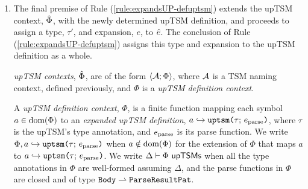{{{{\begin{enumerate}
\begin{condition} All of the following must hold:
\begin{enumerate}
\item For every $\cpv$, we have $\encodeCEPat{\cpv}{\ecand}$ for some $\ecand$ such that $\hastypeUC{\ecand}{\tCEPat}$ and $\isvalU{\ecand}$.
\item If $\hastypeUC{\ecand}{\tCEPat}$ and $\isvalU{\ecand}$ then $\decodeCEPat{\ecand}{\cpv}$ for some $\cpv$.
\item If $\encodeCEPat{\cpv}{\ecand}$ then $\decodeCEPat{\ecand}{\cpv}$.
\item If $\hastypeUC{\ecand}{\tCEPat}$ and $\isvalU{\ecand}$ and $\decodeCEPat{\ecand}{\cpv}$ then $\encodeCEPat{\cpv}{\ecand}$.
\item If $\encodeCEPat{\cpv}{\ecand}$ and $\encodeCEPat{\cpv}{\ecand'}$ then $\ecand=\ecand'$.
\item If $\hastypeUC{\ecand}{\tCEPat}$ and $\isvalU{\ecand}$ and $\decodeCEPat{\ecand}{\cpv}$ and $\decodeCEPat{\ecand}{\cpv'}$ then $\cpv=\cpv'$.
\end{enumerate}
\end{condition}


\item The final premise of Rule (\ref{rule:expandsUP-defuptsm}) extends the upTSM context, $\hat\Phi$, with the newly determined {upTSM definition}, and proceeds to assign a type, $\tau'$, and expansion, $e$, to ${\hat e}$. The conclusion of Rule (\ref{rule:expandsUP-defuptsm}) assigns this type and expansion to the upTSM definition as a whole.%



\emph{upTSM contexts}, $\hat\Phi$, are of the form $\langle \mathcal{A}; \Phi \rangle$, where $\mathcal{A}$ is a {TSM naming context}, defined previously, and $\Phi$ is a \emph{upTSM definition context}. 


A \emph{upTSM definition context}, $\Phi$, is a finite function mapping each symbol $a \in \text{dom}(\Phi)$ to an \emph{expanded upTSM definition}, $a \hookrightarrow \texttt{uptsm}\texttt{(}\tau;\,e_\text{parse}\texttt{)}$, where $\tau$ is the upTSM's type annotation, and $e_\text{parse}$ is its parse function. We write $\Phi, a \hookrightarrow \texttt{uptsm}\texttt{(}\tau;\,e_\text{parse}\texttt{)}$ when $a \notin \text{dom}(\Phi)$ for the extension of $\Phi$ that maps $a$ to $a \hookrightarrow \texttt{uptsm}\texttt{(}\tau;\,e_\text{parse}\texttt{)}$. We write $\Delta \vdash \Phi~\mathsf{upTSMs}$  when all the type annotations in $\Phi$ are well-formed assuming $\Delta$, and the parse functions in $\Phi$ are closed and of type $\mathtt{Body} \rightharpoonup \mathtt{ParseResultPat}$.


\end{enumerate}}}}}
